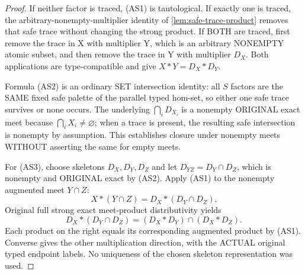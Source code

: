 \begin{proof}
If neither factor is
traced, (AS1) is
tautological. If exactly
one is traced, the
arbitrary-nonempty-multiplier
identity of
\cref{lem:safe-trace-product}
removes that safe trace
without changing the
strong product. If
BOTH are traced, first
remove the trace in X
with multiplier Y, which
is an arbitrary NONEMPTY
atomic subset, and then
remove the trace in Y
with multiplier $D_X$.
Both applications are
type-compatible and
give $X*Y=D_X*D_Y$.

Formula (AS2) is an
ordinary SET intersection
identity: all $S$ factors
are the SAME fixed safe
palette of the parallel
typed hom-set, so either
one safe trace survives
or none occurs. The
underlying
$\bigcap_iD_{X_i}$
is a nonempty ORIGINAL
exact meet because
$\bigcap_iX_i\ne
\varnothing$; when
a trace is present,
the resulting safe
intersection is
nonempty by assumption.
This establishes closure
under nonempty meets
WITHOUT asserting the
same for empty meets.

For (AS3), choose
skeletons $D_X,D_Y,D_Z$
and let
$D_{YZ}=D_Y\cap D_Z$,
which is nonempty and
ORIGINAL exact by (AS2).
Apply (AS1) to the
nonempty augmented meet
$Y\cap Z$:
\[
 X*(Y\cap Z)
      =D_X*(D_Y\cap D_Z).
\]
Original full strong
exact meet-product
distributivity yields
\[
 D_X*(D_Y\cap D_Z)
    =(D_X*D_Y)
          \cap(D_X*D_Z).
\]
Each product on the
right equals its
corresponding augmented
product by (AS1).
Converse gives the
other multiplication
direction, with the
ACTUAL original typed
endpoint labels.
No uniqueness of the
chosen skeleton
representation was used.
\end{proof}

